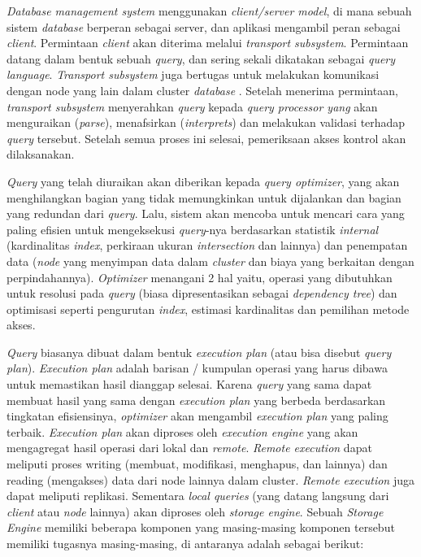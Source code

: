 \emph{Database management system} menggunakan \emph{client/server model}, di mana 
sebuah sistem \emph{database} berperan sebagai server, dan aplikasi mengambil 
peran sebagai \emph{client}. Permintaan \emph{client} akan diterima melalui 
\emph{transport subsystem}. Permintaan datang dalam bentuk sebuah \emph{query}, dan 
sering sekali dikatakan sebagai \emph{query language}. \emph{Transport subsystem} 
juga bertugas untuk melakukan komunikasi dengan node yang lain dalam 
cluster \emph{database} . Setelah menerima permintaan, \emph{transport subsystem} 
menyerahkan \emph{query} kepada \emph{query processor yang} akan menguraikan (\emph{parse}), 
menafsirkan (\emph{interprets}) dan melakukan validasi terhadap \emph{query} tersebut. 
Setelah semua proses ini selesai, pemeriksaan akses kontrol akan dilaksanakan.

\emph{Query} yang telah diuraikan akan diberikan kepada \emph{query optimizer}, yang 
akan menghilangkan bagian yang tidak memungkinkan untuk dijalankan dan bagian yang 
redundan dari \emph{query}. Lalu, sistem akan mencoba untuk mencari cara yang 
paling efisien untuk mengeksekusi \emph{query}-nya berdasarkan statistik \emph{internal} 
(kardinalitas \emph{index}, perkiraan ukuran \emph{intersection} dan lainnya) dan 
penempatan data (\emph{node} yang menyimpan data dalam \emph{cluster} dan biaya yang 
berkaitan dengan perpindahannya). \emph{Optimizer} menangani 2 hal yaitu, 
operasi yang dibutuhkan untuk resolusi pada \emph{query} (biasa dipresentasikan 
sebagai \emph{dependency tree}) dan optimisasi seperti pengurutan \emph{index}, estimasi 
kardinalitas dan pemilihan metode akses.

\emph{Query} biasanya dibuat dalam bentuk \emph{execution plan} (atau bisa disebut 
\emph{query plan}). \emph{Execution plan} adalah barisan / kumpulan operasi yang harus 
dibawa untuk memastikan hasil dianggap selesai. Karena \emph{query} yang sama 
dapat membuat hasil yang sama dengan \emph{execution plan} yang berbeda 
berdasarkan tingkatan efisiensinya, \emph{optimizer} akan mengambil \emph{execution 
plan} yang paling terbaik. \emph{Execution plan} akan diproses oleh \emph{execution 
engine} yang akan mengagregat hasil operasi dari lokal dan \emph{remote}. 
\emph{Remote execution} dapat meliputi proses writing (membuat, modifikasi, 
menghapus, dan lainnya) dan reading (mengakses) data dari node lainnya 
dalam cluster. \emph{Remote execution} juga dapat meliputi replikasi. 
Sementara \emph{local queries} (yang datang langsung dari \emph{client} atau \emph{node} 
lainnya) akan diproses oleh \emph{storage engine}. Sebuah \emph{Storage Engine} 
memiliki beberapa komponen yang masing-masing komponen tersebut memiliki 
tugasnya masing-masing, di antaranya adalah sebagai berikut:


